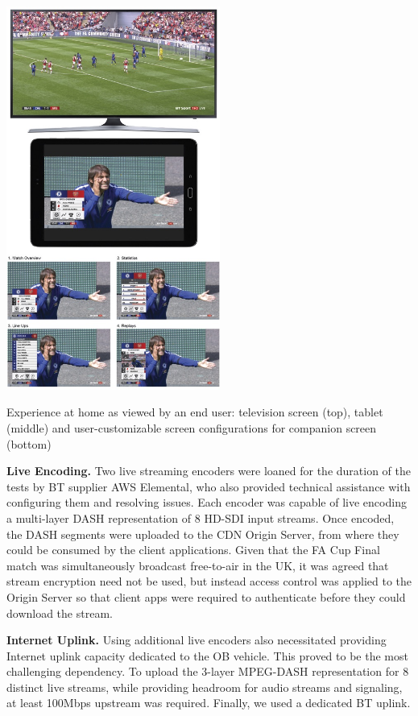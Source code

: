 \documentclass[sigchi-a, authorversion]{acmart}
\begin{document}
\begin{marginfigure}
\hspace*{-0.5cm}
    \includegraphics[width=7cm]{Figures/footballathome1.jpg}
    
    \caption{Experience at home as viewed by an end user: television screen (top), tablet (middle) and user-customizable screen configurations for companion screen (bottom)}
    \label{fig:homeexperience}
\end{marginfigure}

\vspace{5pt}\noindent\textbf{Live Encoding.} Two live streaming encoders were loaned for the duration
of the tests by BT supplier AWS Elemental, who also provided technical assistance
with configuring them and resolving issues. Each encoder was capable of live
encoding a multi-layer DASH representation of 8 HD-SDI input streams. Once
encoded, the DASH segments were uploaded to the CDN Origin Server, from where
they could be consumed by the client applications. Given that the FA Cup Final
match was simultaneously broadcast free-to-air in the UK, it was agreed that
stream encryption need not be used, but instead access control was applied to
the Origin Server so that client apps were required to authenticate before they
could download the stream.

\vspace{5pt}\noindent\textbf{Internet Uplink.} Using additional live encoders
also necessitated providing Internet uplink capacity dedicated to the OB vehicle. This
proved to be the most challenging dependency. To upload the 3-layer
MPEG-DASH representation for 8 distinct live streams, while providing headroom
for audio streams and signaling, at least 100Mbps upstream was required. Finally, we used a dedicated BT uplink.
\end{document}

